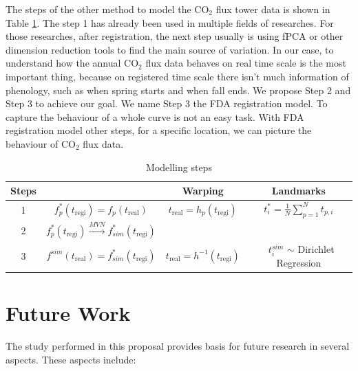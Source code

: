 \documentclass{article}\usepackage[]{graphicx}\usepackage[]{color}
\begin{document}
The steps of the other method to model the CO$_2$ flux tower data is shown in Table \ref{Tab:ModelStep}. The step 1 has already been used in multiple fields of researches.  For those researches, after registration,  the next step usually is using fPCA or other dimension reduction tools to find the main source of variation. In our case,  to understand how the annual CO$_2$ flux data behaves on real time scale is the most important thing, because on registered time scale there isn't much information of phenology, such as when spring starts and when fall ends.
We propose Step 2 and Step 3 to achieve our goal. We name Step 3 the FDA registration model. To capture the behaviour of a whole curve is not an easy task. With FDA registration model other steps, for a specific location, we can picture the behaviour of CO$_2$ flux data. 

\begin{table}[!h]
\caption{Modelling steps}\label{Tab:ModelStep}
\centering
\def\arraystretch{1.5}
\begin{tabular}{cccc}
\hline
\textbf{Steps} & & \textbf{Warping} & \textbf{Landmarks}\\
\hline 
 1 & $f^{*}_p(t_{\textrm{regi}}) = f_p(t_{\textrm{real}})$ & $t_{\textrm{real}}=h_p(t_{\textrm{regi}})$ &  $t_i^{*}=\frac{1}{N}\sum_{p=1}^Nt_{p,i}$ \\
 2 & $f^{*}_p(t_{\textrm{regi}}) \xrightarrow{MVN} f^{*}_{sim}(t_{\textrm{regi}}) $ &  & \\
 3 & $f^{sim}(t_{\textrm{real}}) = f^{*}_{sim}(t_{\textrm{regi}})$ & $t_\textrm{real}=h^{-1}(t_{\textrm{regi}})$ & $\;\;t_i^{sim}$ $\sim$ Dirichlet Regression \\
\hline
\end{tabular}
\end{table}



\section{Future Work}\label{Sec:FutureWork}


The study performed in this proposal provides basis for future research in several aspects. These aspects include:
\end{document}
